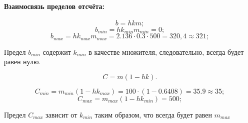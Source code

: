 \paragraph{Взаимосвязь пределов отсчёта:}
$$b = h k m;$$
$$b_{min} = h k_{min} m_{min} = 0;$$
$$b_{max} = h k_{max} m_{max} = 2.136 \cdot 0.3 \cdot 500 = 320,4 \approx 321;$$

Предел $b_{min}$ содержит $k_{min}$ в качестве множителя, следовательно, всегда будет равен нулю.

$$C = m (1 - h k).$$

$$C_{min} = m_{min} \left( 1 - hk_{max} \right ) = 100 \cdot (1 - 0.6408) = 35.9 \approx 35;$$
$$C_{max} = m_{max} \left( 1 - hk_{min} \right ) = 500;$$

Предел $C_{max}$ зависит от $k_{min}$ таким образом, что всегда будет равен $m_{max}$
